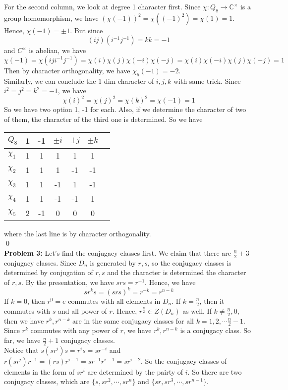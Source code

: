 \documentclass[12pt]{amsart}
\newcommand{\C}{\mathbb{C}}
\begin{document}
\noindent For the second column, we look at degree 1 character first. Since $\chi:Q_8\to \C^\times$ is a group homomorphism, we have $(\chi(-1))^2=\chi((-1)^2)=\chi(1)=1$. Hence, $\chi(-1)=\pm 1$. But since
\[(ij)(i^{-1}j^{-1})=kk=-1\]
and $C^\times$ is abelian, we have
\[\chi(-1)=\chi(iji^{-1}j^{-1})=\chi(i)\chi(j)\chi(-i)\chi(-j)=\chi(i)\chi(-i)\chi(j)\chi(-j)=1\]
Then by character orthogonality, we have $\chi_5(-1)=-2$.\\
Similarly, we can conclude the 1-dim character of $i,j,k$ with same trick. Since $i^2=j^2=k^2=-1$, we have
\[\chi(i)^2=\chi(j)^2=\chi(k)^2=\chi(-1)=1\]
So we have two option 1, -1 for each. Also, if we determine the character of two of them, the character of the third one is determined. So we have

\begin{table}[H]
    \centering
    \begin{tabular}{l|cccccl}
        $Q_8$    & 1 & -1 & $\pm i$ & $\pm j$ & $\pm k$ \\ \hline
        $\chi_1$ & 1 & 1  & 1       & 1       & 1       \\
        $\chi_2$ & 1 & 1  & 1       & -1      & -1      \\
        $\chi_3$ & 1 & 1  & -1      & 1       & -1      \\
        $\chi_4$ & 1 & 1  & -1      & -1      & 1       \\
        $\chi_5$ & 2 & -1 & 0       & 0       & 0
    \end{tabular}
\end{table}
where the last line is by character orthogonality.
\\\qed\\
\textbf{Problem 3:} Let's find the conjugacy classes first. We claim that there are $\frac{n}{2}+3$ conjugacy classes. Since $D_n$ is generated by $r,s$, so the conjugacy classes is determined by conjugation of $r,s$ and the character is determined the character of $r,s$. By the presentation, we have $srs=r^{-1}$. Hence, we have
\[sr^ks=(srs)^k=r^{-k}=r^{n-k}\]
If $k=0$, then $r^0=e$ commutes with all elements in $D_n$. If $k=\frac{n}{2}$, then it commutes with $s$ and all power of $r$. Hence, $r^{\frac{n}{2}}\in Z(D_n)$ as well.
If $k\neq \frac{n}{2},0$, then we have $r^k,r^{n-k}$ are in the same conjugacy classes for all $k=1,2,\cdots \frac{n}{2}-1$. Since $r^k$ commutes with any power of $r$, we have $r^k,r^{n-k}$ is a conjugacy class. So far, we have $\frac{n}{2}+1$ conjugacy classes.\\
Notice that $s(sr^i)s=r^{i}s=sr^{-i}$ and $r(sr^i)r^{-1}=(rs)r^{i-1}=sr^{-1}r^{i-1}=sr^{i-2}$. So the conjugacy classes of elements in the form of $sr^i$ are determined by the pairty of $i$. So there are two conjugacy classes, which are $\{s,sr^2,\cdots, sr^n\}$ and $\{sr,sr^3,\cdots, sr^{n-1}\}$.\\
\end{document}
